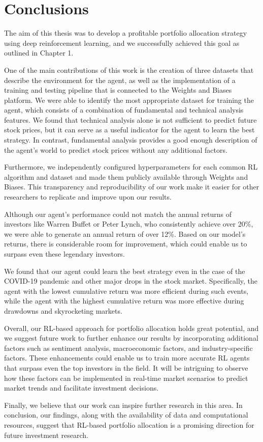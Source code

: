 \documentclass[../xlapes02]{subfiles}
\begin{document}
    \chapter{Conclusions}\label{sec:conclusions}
    The aim of this thesis was to develop a profitable portfolio allocation strategy using deep reinforcement learning, and we successfully achieved this goal as outlined in Chapter 1.

    One of the main contributions of this work is the creation of three datasets that describe the environment for the agent, as well as the implementation of a training and testing pipeline that is connected to the Weights and Biases platform. We were able to identify the most appropriate dataset for training the agent, which consists of a combination of fundamental and technical analysis features. We found that technical analysis alone is not sufficient to predict future stock prices, but it can serve as a useful indicator for the agent to learn the best strategy. In contrast, fundamental analysis provides a good enough description of the agent's world to predict stock prices without any additional factors.

    Furthermore, we independently configured hyperparameters for each common RL algorithm and dataset and made them publicly available through Weights and Biases. This transparency and reproducibility of our work make it easier for other researchers to replicate and improve upon our results.

    Although our agent's performance could not match the annual returns of investors like Warren Buffet or Peter Lynch, who consistently achieve over 20\%, we were able to generate an annual return of over 12\%. Based on our model's returns, there is considerable room for improvement, which could enable us to surpass even these legendary investors.

    We found that our agent could learn the best strategy even in the case of the COVID-19 pandemic and other major drops in the stock market. Specifically, the agent with the lowest cumulative return was more efficient during such events, while the agent with the highest cumulative return was more effective during drawdowns and skyrocketing markets.

    Overall, our RL-based approach for portfolio allocation holds great potential, and we suggest future work to further enhance our results by incorporating additional factors such as sentiment analysis, macroeconomic factors, and industry-specific factors. These enhancements could enable us to train more accurate RL agents that surpass even the top investors in the field. It will be intriguing to observe how these factors can be implemented in real-time market scenarios to predict market trends and facilitate investment decisions.

    Finally, we believe that our work can inspire further research in this area. In conclusion, our findings, along with the availability of data and computational resources, suggest that RL-based portfolio allocation is a promising direction for future investment research.
\end{document}
